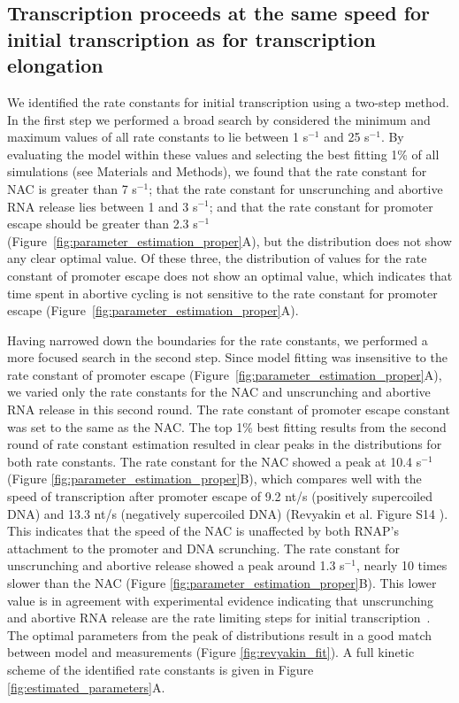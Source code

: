 %
\subsection{Transcription proceeds at the same speed for initial transcription
as for transcription elongation}

We identified the rate constants for initial transcription using a two-step
method. In the first step we performed a broad search by considered the
minimum and maximum values of all rate constants to lie between 1 s$^{-1}$ and
25 s$^{-1}$. By evaluating the model within these values and selecting the
best fitting 1\% of all simulations (see Materials and Methods), we found that
the rate constant for NAC is greater than 7 s$^{-1}$; that the rate
constant for unscrunching and abortive RNA release lies between 1 and 3
s$^{-1}$; and that the rate constant for promoter escape should be greater
than 2.3 s$^{-1}$ (Figure~\ref{fig:parameter_estimation_proper}A), but the
distribution does not show any clear optimal value. Of these three, the
distribution of values for the rate constant of promoter escape does not
show an optimal value, which indicates that time spent in abortive cycling is
not sensitive to the rate constant for promoter escape
(Figure~\ref{fig:parameter_estimation_proper}A).

Having narrowed down the boundaries for the rate constants, we performed a
more focused search in the second step. Since model fitting was insensitive to
the rate constant of promoter escape
(Figure~\ref{fig:parameter_estimation_proper}A), we varied only the rate
constants for the NAC and unscrunching and abortive RNA release in this second
round. The rate constant of promoter escape constant was set to the same as
the NAC. The top 1\% best fitting results from the second round of rate
constant estimation resulted in clear peaks in the distributions for both rate
constants. The rate constant for the NAC showed a peak at 10.4 s$^{-1}$
(Figure \ref{fig:parameter_estimation_proper}B), which compares well with the
speed of transcription after promoter escape of 9.2 nt/s (positively
supercoiled DNA) and 13.3 nt/s (negatively supercoiled DNA) (Revyakin et al.
Figure S14 \cite{revyakin_abortive_2006}). This indicates that the speed of
the NAC is unaffected by both RNAP's attachment to the promoter and DNA
scrunching. The rate constant for unscrunching and abortive release showed a
peak around 1.3 s$^{-1}$, nearly 10 times slower than the NAC (Figure
\ref{fig:parameter_estimation_proper}B). This lower value is in agreement with
experimental evidence indicating that unscrunching and abortive RNA release
are the rate limiting steps for initial
transcription~\cite{revyakin_abortive_2006, margeat_direct_2006}. The optimal
parameters from the peak of distributions result in a good match between model
and measurements (Figure \ref{fig:revyakin_fit}). A full kinetic scheme of the
identified rate constants is given in Figure \ref{fig:estimated_parameters}A.

